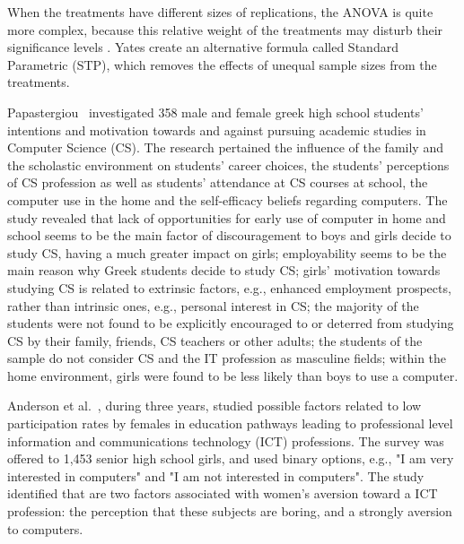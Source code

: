 When the treatments have different sizes of replications, the ANOVA is quite more complex\cite{ott2008introduction}, because this relative weight of the treatments may disturb their significance levels \cite{schuessler1971analyzing}. Yates \cite{herr_history_1986} create an alternative formula called Standard Parametric (STP), which removes the effects of unequal sample sizes from the treatments.

%

Papastergiou~\cite{papastergiou_are_2008} investigated 358 male and female greek high school students' intentions and motivation towards and against pursuing academic studies in Computer Science (CS). The research pertained the influence of the family and the scholastic environment on students' career choices, the students' perceptions of CS profession as well as students' attendance at CS courses at school, the computer use in the home and the self-efficacy beliefs regarding computers. The study revealed that lack of opportunities for early use of computer in home and school seems to be the main factor of discouragement to boys and girls decide to study CS, having a much greater impact on girls; employability seems to be the main reason why Greek students decide to study CS; girls' motivation towards studying CS is related to extrinsic factors, e.g., enhanced employment prospects, rather than intrinsic ones, e.g., personal interest in CS; the majority of the students were not found to be explicitly encouraged to or deterred from studying CS by their family, friends, CS teachers or other adults; the students of the sample do not consider CS and the IT profession as masculine fields; within the home environment, girls were found to be less likely than boys to use a computer.

Anderson et al.~\cite{anderson_because_2008}, during three years, studied possible factors related to  low participation rates by females in education pathways leading to professional level information and communications technology (ICT) professions. The survey was offered to 1,453 senior high school girls, and used binary options, e.g., "I am very interested in computers" and "I am not interested in computers". The study identified that are two factors associated with women's aversion toward a ICT profession: the
perception that these subjects are boring, and a strongly aversion to computers. 